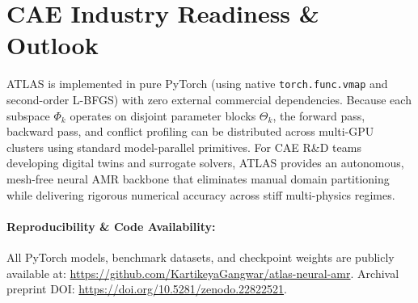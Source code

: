 \documentclass[10pt,a4paper,twocolumn]{article}
\begin{document}
\section{CAE Industry Readiness \& Outlook}
ATLAS is implemented in pure PyTorch (using native \texttt{torch.func.vmap} and second-order L-BFGS) with zero external commercial dependencies. Because each subspace $\Phi_k$ operates on disjoint parameter blocks $\Theta_k$, the forward pass, backward pass, and conflict profiling can be distributed across multi-GPU clusters using standard model-parallel primitives. For CAE R\&D teams developing digital twins and surrogate solvers, ATLAS provides an autonomous, mesh-free neural AMR backbone that eliminates manual domain partitioning while delivering rigorous numerical accuracy across stiff multi-physics regimes.

\paragraph{Reproducibility \& Code Availability:} All PyTorch models, benchmark datasets, and checkpoint weights are publicly available at: \url{https://github.com/KartikeyaGangwar/atlas-neural-amr}. Archival preprint DOI: \url{https://doi.org/10.5281/zenodo.22822521}.
\end{document}
